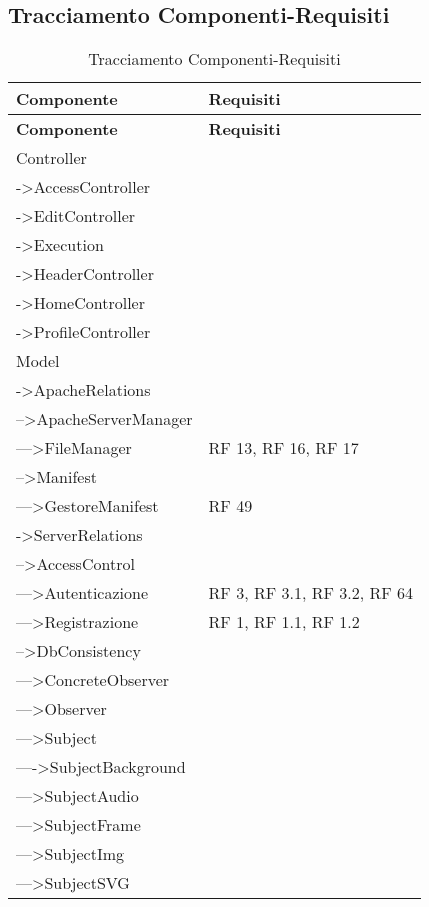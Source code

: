 \subsection{Tracciamento Componenti-Requisiti}{ 
\renewcommand*{\arraystretch}{1.4} 
\begin{longtable} [c]{| p{8cm} | p{5cm} |} 
\caption{Tracciamento Componenti-Requisiti \label{tab:traccCompReq}}\\ \hline\textbf{Componente} & \textbf{Requisiti} \\ 
\hline \endfirsthead \hline 
\textbf{Componente} & \textbf{Requisiti} \\ 
\hline \endhead \hline \endfoot \hline \endlastfoot 
Controller & \\ 
 \hline 
->AccessController & \\ 
 \hline 
->EditController & \\ 
 \hline 
->Execution & \\ 
 \hline 
->HeaderController & \\ 
 \hline 
->HomeController & \\ 
 \hline 
->ProfileController & \\ 
 \hline 
Model & \\ 
 \hline 
->ApacheRelations & \\ 
 \hline 
-->ApacheServerManager & \\ 
 \hline 
--->FileManager & RF 13, RF 16, RF 17\\ 
 \hline 
-->Manifest & \\ 
 \hline 
--->GestoreManifest & RF 49\\ 
 \hline 
->ServerRelations & \\ 
 \hline 
-->AccessControl & \\ 
 \hline 
--->Autenticazione & RF 3, RF 3.1, RF 3.2, RF 64\\ 
 \hline 
--->Registrazione & RF 1, RF 1.1, RF 1.2\\ 
 \hline 
-->DbConsistency & \\ 
 \hline 
--->ConcreteObserver & \\ 
 \hline 
--->Observer & \\ 
 \hline 
--->Subject & \\ 
 \hline 
---->SubjectBackground & \\ 
 \hline 
--->SubjectAudio & \\ 
 \hline 
--->SubjectFrame & \\ 
 \hline 
--->SubjectImg & \\ 
 \hline 
--->SubjectSVG & \\ 

\end{longtable}}
